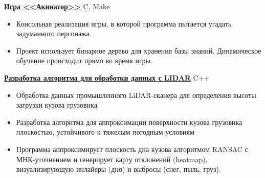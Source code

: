 \documentclass[a4paper,12pt]{article}
\begin{document}
\vspace{1.25em}

\href{https://github.com/HaipoviyPodrostok/Akinator} {\textbf{\color{primary} Игра <<Акинатор>>}} \faGithub
\hfill \textcolor{secondary}{C, Make}
\begin{itemize}
\item Консольная реализация игры, в которой программа пытается угадать задуманного персонажа. 
\item Проект использует бинарное дерево для хранения базы знаний. Динамическое обучение происходит прямо во время игры.
\end{itemize}

\vspace{1.25em}

\href{https://github.com/HaipoviyPodrostok/LIDAR} {\textbf{\color{primary} Разработка алгоритма для обработки данных с LIDAR}} \faGithub
\hfill \textcolor{secondary}{C++}
\begin{itemize}
\item Обработка данных промышленного LiDAR-сканера для определения высоты загрузки кузова грузовика.
\item Разработка алгоритма для аппроксимации поверхности кузова грузовика плоскостью, устойчивого к тяжелым погодным условиям
\item Программа аппроксимирует плоскость дна кузова алгоритмом RANSAC с МНК-уточнением и генерирует карту отклонений (heatmap), визуализирующую инлайеры (дно) и выбросы (снег, пыль, груз).
\end{itemize}
\end{document}
